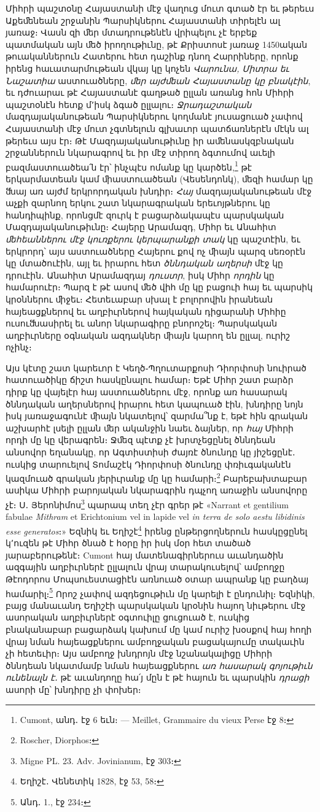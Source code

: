 \documentclass{article}
\begin{document}
{Միհրի պաշտօնը Հայաստանի մէջ վաղուց մուտ գտած էր եւ թերեւս Աքեﬔնեան շրջանին Պարսիկներու Հայաստանի տիրելէն ալ յառաջ։ Վասն զի ﬔր մտադրութենէն վրիպելու չէ երբեք պատմական այն ﬔծ իրողութիւնը, թէ Քրիստոսէ յառաջ 1450ական թուականներուն Հատերու հետ դաշինք դնող Հարրիները, որոնք իրենց հաւատարմութեան վկայ կը կոչեն \emph{Վարունա, Միտրա եւ Նաշատիա} աստուածները, \emph{ﬔր այժﬔան Հայաստանը կը բնակէին}, եւ դժուարաւ թէ Հայաստանէ գաղթած ըլլան առանց հոն Միհրի պաշտօնէն հետք մ՚իսկ ձգած ըլլալու։ \emph{Ջրադաշտական} մազդայականութեան Պարսիկներու կողմանէ յուսացուած չափով Հայաստանի մէջ մուտ չգտնելուն գլխաւոր պատճառներէն մէկն ալ թերեւս այս էր։ Թէ Մազդայականութիւնը իր աﬔնասկզբնական շրջաններուն նկարագրով եւ իր մէջ տիրող ձգտումով աւելի բազմաստուածեա՛ն էր՝ ինչպէս ոմանք կը կարծեն,\footnote{Cumont, անդ․ էջ 6 եւն։ — Meillet, Grammaire du vieux Perse էջ 8։} թէ երկարմատեան կամ ﬕաստուածեան (Վեսենդոնկ), ﬔզի համար կը ﬓայ առ այժմ երկրորդական խնդիր։ \emph{Հայ} մազդայականութեան մէջ աչքի զարնող երկու շատ նկարագրական երեւոյթներու կը հանդիպինք, որոնցմէ զուրկ է բացարձակապէս պարսկական Մազդայականութիւնը։ Հայերը Արամազդ, Միհր եւ Անահիտ \emph{ﬔհեաններու մէջ կուռքերու կերպարանքի տակ} կը պաշտէին, եւ երկրորդ՝ այս աստուածները Հայերու քով ոչ ﬕայն պարզ սեռօրէն կը մտածուէին, այլ եւ իրարու հետ \emph{ծննդական աղերսի} մէջ կը դրուէին․ Անահիտ Արամազդայ \emph{դուստր}, իսկ Միհր \emph{որդին} կը համարուէր։ Պարզ է թէ ասով ﬔծ վիհ մը կը բացուի հայ եւ պարսիկ կրօններու ﬕջեւ։ Հետեւաբար սխալ է բոլորովին իրանեան հայեացքներով եւ աղբիւրներով հայկական դիցարանի Միհիը ուսուﬓասիրել եւ անոր նկարագիրը բնորոշել։ Պարսկական աղբիւրները օգնական ազդակներ ﬕայն կարող են ըլլալ, ուրիշ ոչինչ։

Այս կէտը շատ կարեւոր է Կեղծ֊Պղուտարքոսի Դիորփոսի նուիրած հատուածիկը ճիշտ հասկընալու համար։ Եթէ Միհր շատ բարձր դիրք կը վայելէր հայ աստուածներու մէջ, որոնք առ հասարակ ծննդական աղերսներով իրարու հետ կապուած էին, խնդիրը նոյն իսկ յառաջագունէ ﬕայն նկատելով՝ զարմա՞նք է, եթէ հին գրական աշխարհէ լսելի ըլլան ﬔր ականջին նաեւ ձայներ, որ \emph{հայ} Միհրի որդի մը կը վերագրեն։ Ջﬔզ պէտք չէ խրտչեցընել ծննդեան անսովոր եղանակը, որ Ագտիստիսի ժայռէ ծնունդը կը յիշեցընէ․ ուսկից տարուելով Տոմաշէկ Դիորփոսի ծնունդը փռիւգականէն կազմուած գրական յերիւրանք մը կը համարի։\footnote{Roscher, Diorphos։} Բարեբախտաբար ասիկա Միհրի բարոյական նկարագրին դպչող առաջին անսովորը չէ։ Ս․ Յերոնիմոս\footnote{Migne PL. 23. Adv. Jovinianum, էջ 303։} պարապ տեղ չէր գրեր թէ «Narrant et gentilium fabulae \emph{Mithram} et Erichtonium vel in lapide vel \emph{in terra de solo aestu libidinis esse generatos}։» Եզնիկ եւ Եղիշէ\footnote{Եղիշէ․ Վենետիկ 1828, էջ 53, 58։} իրենց ընթերցողներուն հասկըցընել կ՚ուզեն թէ Միհր ծնած է հօրը իր իսկ մօր հետ տածած յարաբերութենէ։ Cumont հայ մատենագիրներուս աւանդածին ազգային աղբիւրներէ ըլլալուն վրայ տարակուսելով՝ ամբողջը Թէոդորոս Մոպսուեստացիէն առնուած օտար ապրանք կը բաղձայ համարիլ։\footnote{Անդ․ 1., էջ 234։} Որոշ չափով ազդեցութիւն մը կարելի է ընդունիլ։ Եզնիկի, բայց մանաւանդ Եղիշէի պարսկական կրօնին հայող նիւթերու մէջ ասորական աղբիւրներէ օգտուիլը ցուցուած է, ուսկից բնականաբար բացարձակ կախում մը կամ ուրիշ խօսքով հայ հողի վրայ նման հայեացքներու ամբողջական բացակայումը տակաւին չի հետեւիր։ Այս ամբողջ խնդրոյն մէջ նշանակալիցը Միհրի ծննդեան նկատմամբ նման հայեացքներու \emph{առ հասարակ գոյութիւն ունենալն է․} թէ աւանդողը հա՛յ մըն է թէ հայուն եւ պարսկին \emph{դրացի} ասորի մը՝ խնդիրը չի փոխեր։

}
\end{document}
